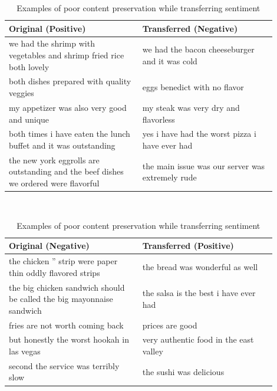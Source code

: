 \begin{table}[ht]
	\centering
	\begin{tabular}{| p{0.45\linewidth} | p{0.45\linewidth} |}
		\hline
		\textbf{{Original (Positive)}}                                                      & \textbf{Transferred (Negative)}                  \\
		\hline
		\hline
		we had the shrimp with vegetables and shrimp fried rice both lovely                 & we had the bacon cheeseburger and it was cold    \\
		\hline
		both dishes prepared with quality veggies                                           & eggs benedict with no flavor                     \\
		\hline
		my appetizer was also very good and unique                                          & my steak was very dry and flavorless             \\
		\hline
		both times i have eaten the lunch buffet and it was outstanding                     & yes i have had the worst pizza i have ever had   \\
		\hline
		the new york eggrolls are outstanding and the beef dishes we ordered were flavorful & the main issue was our server was extremely rude \\
		\hline
	\end{tabular}
	\\
	\begin{tabular}{| p{0.45\linewidth} | p{0.45\linewidth} |}
		\hline
		\textbf{{Original (Negative)}}                                        & \textbf{Transferred (Positive)}        \\
		\hline
		\hline
		the chicken '' strip were paper thin oddly flavored strips            & the bread was wonderful as well        \\
		\hline
		the big chicken sandwich should be called the big mayonnaise sandwich & the salsa is the best i have ever had  \\
		\hline
		fries are not worth coming back                                       & prices are good                        \\
		\hline
		but honestly the worst hookah in las vegas                            & very authentic food in the east valley \\
		\hline
		second the service was terribly slow                                  & the sushi was delicious                \\
		\hline
	\end{tabular}
	\caption{Examples of poor content preservation while transferring sentiment}
	\label{tab:poor-content-preservation}
\end{table}

